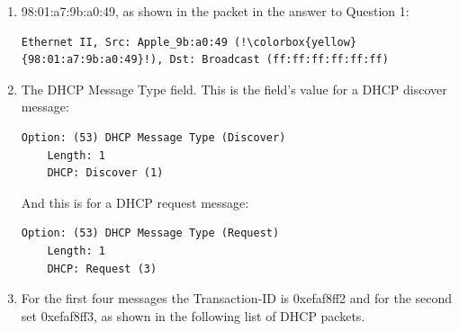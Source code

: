 \documentclass{article}
\begin{document}
\begin{enumerate}

    \item 98:01:a7:9b:a0:49, as shown in the packet in the answer to Question 1:
\begin{verbatim}
Ethernet II, Src: Apple_9b:a0:49 (!\colorbox{yellow}{98:01:a7:9b:a0:49}!), Dst: Broadcast (ff:ff:ff:ff:ff:ff)
\end{verbatim}

    \item The DHCP Message Type field. This is the field's value for a DHCP discover message:
\begin{verbatim}
Option: (53) DHCP Message Type (Discover)
    Length: 1
    DHCP: Discover (1)
\end{verbatim}
    And this is for a DHCP request message:
\begin{verbatim}
Option: (53) DHCP Message Type (Request)
    Length: 1
    DHCP: Request (3)
\end{verbatim}

    \item For the first four messages the Transaction-ID is 0xefaf8ff2 and for the second set 0xefaf8ff3, as shown in the following list of DHCP packets.
    

\end{enumerate}
\end{document}
